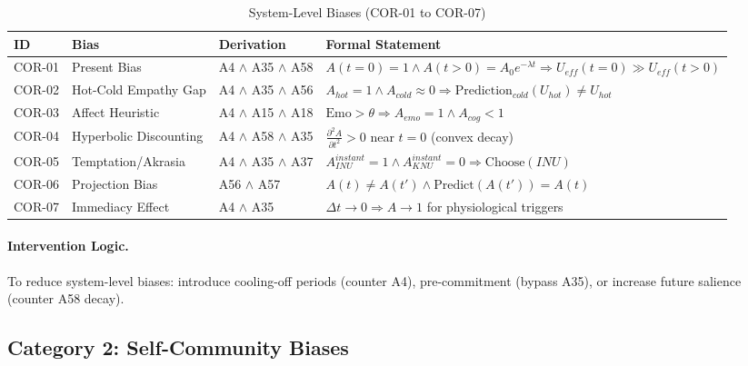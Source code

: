 \begin{table}[htbp]
\small
\centering
\caption{System-Level Biases (COR-01 to COR-07)}
\label{tab:cor-system}
\begin{tabular}{p{1.2cm}p{2.5cm}p{4cm}p{5cm}}
\toprule
\textbf{ID} & \textbf{Bias} & \textbf{Derivation} & \textbf{Formal Statement} \\
\midrule
COR-01 & Present Bias & A4 $\land$ A35 $\land$ A58 & $A(t=0) = 1 \land A(t>0) = A_0 e^{-\lambda t} \Rightarrow U_{eff}(t=0) \gg U_{eff}(t>0)$ \\
COR-02 & Hot-Cold Empathy Gap & A4 $\land$ A35 $\land$ A56 & $A_{hot} = 1 \land A_{cold} \approx 0 \Rightarrow \text{Prediction}_{cold}(U_{hot}) \neq U_{hot}$ \\
COR-03 & Affect Heuristic & A4 $\land$ A15 $\land$ A18 & $\text{Emo} > \theta \Rightarrow A_{emo} = 1 \land A_{cog} < 1$ \\
COR-04 & Hyperbolic Discounting & A4 $\land$ A58 $\land$ A35 & $\frac{\partial^2 A}{\partial t^2} > 0$ near $t=0$ (convex decay) \\
COR-05 & Temptation/Akrasia & A4 $\land$ A35 $\land$ A37 & $A_{INU}^{instant} = 1 \land A_{KNU}^{instant} = 0 \Rightarrow \text{Choose}(INU)$ \\
COR-06 & Projection Bias & A56 $\land$ A57 & $A(t) \neq A(t') \land \text{Predict}(A(t')) = A(t)$ \\
COR-07 & Immediacy Effect & A4 $\land$ A35 & $\Delta t \to 0 \Rightarrow A \to 1$ for physiological triggers \\
\bottomrule
\end{tabular}
\end{table}

\paragraph{Intervention Logic.} To reduce system-level biases: introduce cooling-off periods (counter A4), pre-commitment (bypass A35), or increase future salience (counter A58 decay).


\subsection{Category 2: Self-Community Biases}

